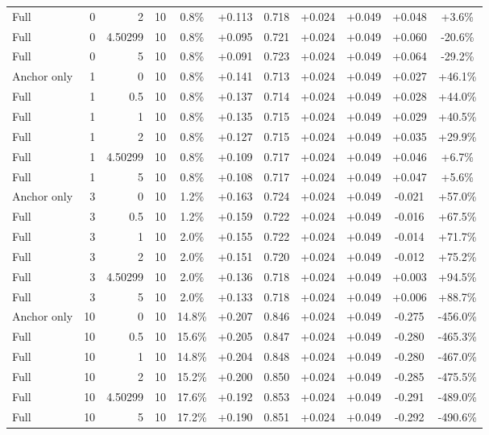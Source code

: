 \begin{table}[htbp]
\begin{tabular}{lrrrccccccc}
Full & 0 & 2 & 10 & 0.8\% & +0.113 & 0.718 & +0.024 & +0.049 & +0.048 & +3.6\% \\
Full & 0 & 4.50299 & 10 & 0.8\% & +0.095 & 0.721 & +0.024 & +0.049 & +0.060 & -20.6\% \\
Full & 0 & 5 & 10 & 0.8\% & +0.091 & 0.723 & +0.024 & +0.049 & +0.064 & -29.2\% \\
Anchor only & 1 & 0 & 10 & 0.8\% & +0.141 & 0.713 & +0.024 & +0.049 & +0.027 & +46.1\% \\
Full & 1 & 0.5 & 10 & 0.8\% & +0.137 & 0.714 & +0.024 & +0.049 & +0.028 & +44.0\% \\
Full & 1 & 1 & 10 & 0.8\% & +0.135 & 0.715 & +0.024 & +0.049 & +0.029 & +40.5\% \\
Full & 1 & 2 & 10 & 0.8\% & +0.127 & 0.715 & +0.024 & +0.049 & +0.035 & +29.9\% \\
Full & 1 & 4.50299 & 10 & 0.8\% & +0.109 & 0.717 & +0.024 & +0.049 & +0.046 & +6.7\% \\
Full & 1 & 5 & 10 & 0.8\% & +0.108 & 0.717 & +0.024 & +0.049 & +0.047 & +5.6\% \\
Anchor only & 3 & 0 & 10 & 1.2\% & +0.163 & 0.724 & +0.024 & +0.049 & -0.021 & +57.0\% \\
Full & 3 & 0.5 & 10 & 1.2\% & +0.159 & 0.722 & +0.024 & +0.049 & -0.016 & +67.5\% \\
Full & 3 & 1 & 10 & 2.0\% & +0.155 & 0.722 & +0.024 & +0.049 & -0.014 & +71.7\% \\
Full & 3 & 2 & 10 & 2.0\% & +0.151 & 0.720 & +0.024 & +0.049 & -0.012 & +75.2\% \\
Full & 3 & 4.50299 & 10 & 2.0\% & +0.136 & 0.718 & +0.024 & +0.049 & +0.003 & +94.5\% \\
Full & 3 & 5 & 10 & 2.0\% & +0.133 & 0.718 & +0.024 & +0.049 & +0.006 & +88.7\% \\
Anchor only & 10 & 0 & 10 & 14.8\% & +0.207 & 0.846 & +0.024 & +0.049 & -0.275 & -456.0\% \\
Full & 10 & 0.5 & 10 & 15.6\% & +0.205 & 0.847 & +0.024 & +0.049 & -0.280 & -465.3\% \\
Full & 10 & 1 & 10 & 14.8\% & +0.204 & 0.848 & +0.024 & +0.049 & -0.280 & -467.0\% \\
Full & 10 & 2 & 10 & 15.2\% & +0.200 & 0.850 & +0.024 & +0.049 & -0.285 & -475.5\% \\
Full & 10 & 4.50299 & 10 & 17.6\% & +0.192 & 0.853 & +0.024 & +0.049 & -0.291 & -489.0\% \\
Full & 10 & 5 & 10 & 17.2\% & +0.190 & 0.851 & +0.024 & +0.049 & -0.292 & -490.6\% \\

\end{tabular}
\end{table}
